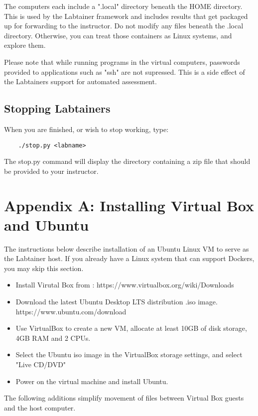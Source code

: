 \documentclass[12pt]{article}
\begin{document}
The computers each include a ".local" directory beneath the HOME directory.  This is used
by the Labtainer framework and includes results that get packaged up for forwarding to the
instructor.  Do not modify any files beneath the .local directory.  Otherwise, you can treat
those containers as Linux systems, and explore them.

Please note that while running programs in the virtual computers, passwords provided to
applications such as "ssh" are not supressed.  This is a side effect of the Labtainers
support for automated assessment.

\subsection{Stopping Labtainers}
When you are finished, or wish to stop working, type:
\begin{verbatim}
    ./stop.py <labname>
\end{verbatim}
The stop.py command will display the directory containing a zip file that should be provided to your instructor.

\newpage
\appendix 
\section {Appendix A: Installing Virtual Box and Ubuntu}
\label{sec:appendixA}
The instructions below describe installation of an Ubuntu Linux VM 
to serve as the Labtainer host.  If you already have a Linux system
that can support Dockers, you may skip this section.
\begin{itemize}
\item Install Virutal Box from : https://www.virtualbox.org/wiki/Downloads
\item Download the latest Ubuntu Desktop LTS distribution .iso image.  https://www.ubuntu.com/download
\item Use VirtualBox to create a new VM, allocate at least 10GB of disk storage, 4GB RAM and 2 CPUs.
\item Select the Ubuntu iso image in the VirtualBox storage settings, and select "Live CD/DVD"
\item Power on the virtual machine and install Ubuntu.
\end{itemize}

The following additions simplify movement of files between Virtual Box guests
and the host computer.
\end{document}
